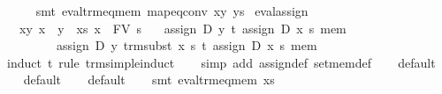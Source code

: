 \begin{isabellebody}
\ \ \ \ \isamarkupfalse%
\ {}smt\ eval{}trm{}eq{}mem\ map{}eq{}conv\ xy\ ys{}\isanewline
{}\isamarkupfalse%
%
\endisatagproof
{\isafoldproof}%
%
\isadelimproof
\isanewline
%
\endisadelimproof
\isanewline
{}\isamarkupfalse%
\ eval{}assign{}{}\isanewline
\ \ \ xy{}\ {}x\ {}\ y{}\ \ xs{}\ {}x\ {}\ FV\ s{}\isanewline
\ \ \ {}assign\ D\ y\ t\ {}assign\ D\ x\ s\ mem{}\ {}\isanewline
\ \ \ \ \ \ \ \ \ assign\ D\ y\ {}trm{}subst\ x\ s\ t{}\ {}assign\ D\ x\ s\ mem{}{}\isanewline
%
\isadelimproof
\ \ %
\endisadelimproof
%
\isatagproof
{}\isamarkupfalse%
\ {}induct\ t\ rule{}\ trm{}simple{}induct{}\isanewline
\ \ \isamarkupfalse%
\ {}simp\ add{}\ assign{}def\ set{}mem{}def{}\isanewline
\ \ \isamarkupfalse%
\ default\isanewline
\ \ \isamarkupfalse%
\ default\isanewline
\ \ \isamarkupfalse%
\ default\isanewline
\ \ \isamarkupfalse%
\ {}smt\ eval{}trm{}eq{}mem\ xs{}\isanewline

\end{isabellebody}

